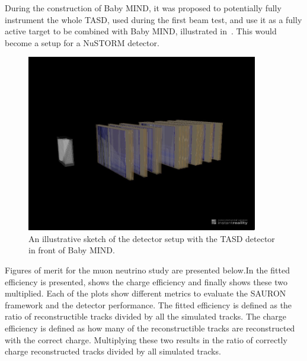 During the construction of Baby MIND, it was proposed to potentially fully instrument the whole TASD, used during the first beam test, and use it as a fully active target to be combined with Baby MIND, illustrated in~. This would become a setup for a NuSTORM detector.

\begin{figure}[h!]
\centering
\includegraphics[width=0.9\textwidth]{figures/MINDAida.jpeg}
\caption{An illustrative sketch of the detector setup with the TASD detector in front of Baby MIND.}
\label{fig:TASDandMIND}
\end{figure}

Figures of merit for the muon neutrino study are presented below.In  the fitted efficiency is presented,  shows the charge efficiency and finally  shows these two multiplied. Each of the plots show different metrics to evaluate the SAURON framework and the detector performance. The fitted efficiency is defined as the ratio of reconstructible tracks divided by all the simulated tracks. The charge efficiency is defined as how many of the reconstructible tracks are reconstructed with the correct charge. Multiplying these two results in the ratio of correctly charge reconstructed tracks divided by all simulated tracks.

